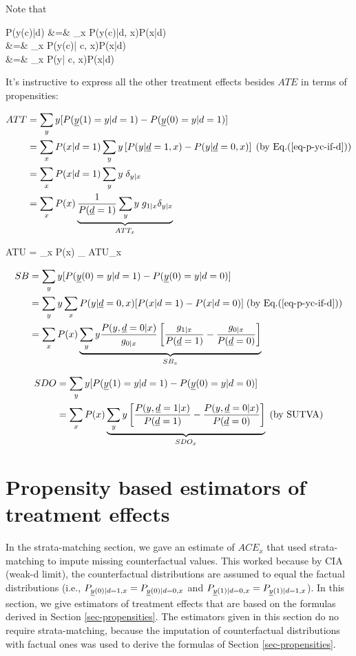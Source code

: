 Note that

\beqa
P(y(c)|d)
&=&
\sum_x P(y(c)|d, x)P(x|d)
\\
&=&
\sum_x P(y(c)| c, x)P(x|d) \;
\\
&=&
\sum_x P(y| c, x)P(x|d)\;
\label{eq-p-yc-if-d}
\eeqa

It's 
instructive
to express all the 
other treatment effects besides 
$ATE$ in terms of propensities: 

\begin{align}
ATT
&=
 \sum_y y [P({\underline{y}}(1)=y|d=1)
-P({\underline{y}}(0)=y|d=1)]
\\
&=
\sum_x P(x|d=1)
\sum_y y
\left[
P(y|{\underline{d}}=1,x)
-
P(y|{\underline{d}}=0,x)
\right]
\;\text{(by Eq.(\ref{eq-p-yc-if-d}))}
\\
&=
\sum_x P(x|d=1)
\sum_y y \;\delta_{y|x}
\\
&=
\sum_x P(x)
\underbrace{
\frac{1}{P({\underline{d}}=1)}
\sum_y y\; g_{1|x}\delta_{y|x}
}_
{ATT_x}
\end{align}

\beq
ATU
=
\sum_x P(x)
_
{ATU_x}
\eeq

\begin{align}
SB&= \sum_y y
[P({\underline{y}}(0)=y|d=1)-P({\underline{y}}(0)=y|d=0)]
\\
&=
\sum_y y
\sum_x P(y| {\underline{d}}=0,x)
[
P(x|d=1)-P(x|d=0)]
\;\text{(by Eq.(\ref{eq-p-yc-if-d}))}
\\
&=
\sum_x P(x)
\underbrace{\sum_y y
\frac{P(y, {\underline{d}}=0|x)}{g_{0|x}}
\left[
\frac{g_{1|x}}{P({\underline{d}}=1)}
-
\frac{g_{0|x}}{P({\underline{d}}=0)}
\right]}_{SB_x}
\end{align}

\begin{align}
SDO
&=
\sum_y y
[P({\underline{y}}(1)=y|d=1)-P({\underline{y}}(0)=y|d=0)]
\\
&=
\sum_x P(x)
\underbrace{\sum_y y
\left[
\frac{P(y, {\underline{d}}=1|x)}{P({\underline{d}}=1)}
-
\frac{P(y, {\underline{d}}=0|x)}{P({\underline{d}}=0)}
\right]}_{SDO_x}
\;\text{(by SUTVA)}
\end{align}

\section{Propensity based  estimators of
treatment effects}

In the  strata-matching
section, we gave an estimate
of $ACE_x$ 
that used  strata-matching
to impute missing
counterfactual  values.
This worked
because
by CIA (weak-d limit),
the counterfactual
distributions 
are assumed to equal
the factual distributions (i.e., 
$P_{{\underline{y}}(0)|d=1, x}=P_{{\underline{y}}(0)|d=0, x}$
and $P_{{\underline{y}}(1)|d=0, x}
=P_{{\underline{y}}(1)|d=1, x}$).
In this 
section,
we give estimators
of treatment effects that
are based on the  formulas derived
in Section \ref{sec-propensities}.
The estimators given in this section
do no require
 strata-matching, because
the imputation of
counterfactual distributions
with factual ones was used to
derive the formulas  
of  Section \ref{sec-propensities}.




